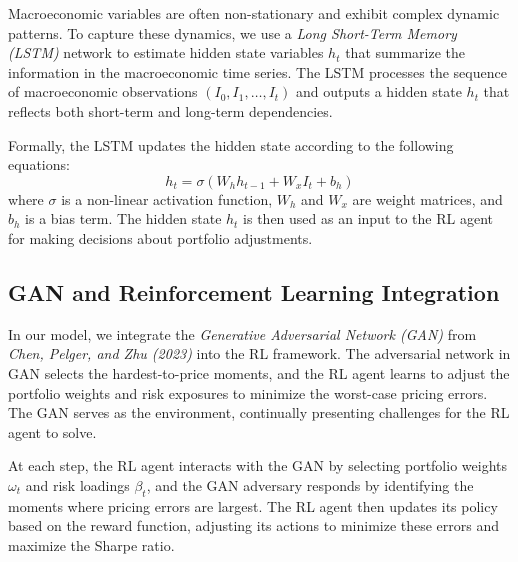 Macroeconomic variables are often non-stationary and exhibit complex dynamic patterns. To capture these dynamics, we use a \textit{Long Short-Term Memory (LSTM)} network to estimate hidden state variables $h_t$ that summarize the information in the macroeconomic time series. The LSTM processes the sequence of macroeconomic observations $\left(I_0, I_1, \ldots, I_t\right)$ and outputs a hidden state $h_t$ that reflects both short-term and long-term dependencies.

Formally, the LSTM updates the hidden state according to the following equations:
\[
h_t = \sigma\left(W_h h_{t-1} + W_x I_t + b_h \right)
\]
where $\sigma$ is a non-linear activation function, $W_h$ and $W_x$ are weight matrices, and $b_h$ is a bias term. The hidden state $h_t$ is then used as an input to the RL agent for making decisions about portfolio adjustments.

\subsection{GAN and Reinforcement Learning Integration}

In our model, we integrate the \textit{Generative Adversarial Network (GAN)} from \textit{Chen, Pelger, and Zhu (2023)} into the RL framework. The adversarial network in GAN selects the hardest-to-price moments, and the RL agent learns to adjust the portfolio weights and risk exposures to minimize the worst-case pricing errors. The GAN serves as the environment, continually presenting challenges for the RL agent to solve.

At each step, the RL agent interacts with the GAN by selecting portfolio weights $\omega_t$ and risk loadings $\beta_t$, and the GAN adversary responds by identifying the moments where pricing errors are largest. The RL agent then updates its policy based on the reward function, adjusting its actions to minimize these errors and maximize the Sharpe ratio.

